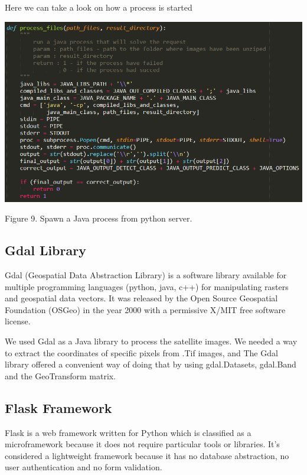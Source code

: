 \documentclass[12pt, a4paper]{report}
\begin{document}
\newpage

Here we can take a look on how a process is started
\par
\medskip
\includegraphics[scale=0.7, center]{python_call_java_2.png}
\begin{center}
Figure 9. Spawn a Java process from python server.
\end{center}

\subsection{Gdal Library}

\quad
Gdal (Geospatial Data Abstraction Library) is a software library available for multiple programming languages (python, java, c++) for manipulating rasters and geospatial data vectors. It was released by the Open Source Geospatial Foundation (OSGeo) in the year 2000 with a permissive X/MIT free software license\cite{Gdal}. 
\par 

We used Gdal as a Java library to process the satellite images. We needed a way to extract the coordinates of specific pixels from .Tif images, and The Gdal library offered a convenient way of doing that by using gdal.Datasets, gdal.Band and the GeoTransform matrix.

\subsection{Flask Framework}

\quad
Flask is a web framework written for Python which is classified as a microframework because it does not require particular tools or libraries. It's considered a lightweight framework because it has no database abstraction, no user authentication and no form validation.
\par 
\end{document}
